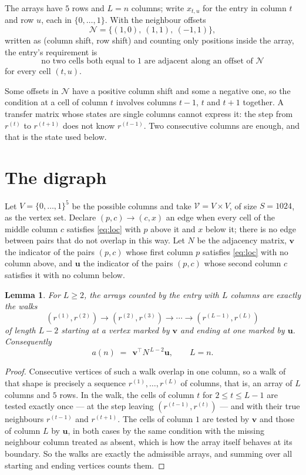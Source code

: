 \documentclass[11pt,a4paper]{article}
\theoremstyle{plain}
\newtheorem{lemma}[theorem]{Lemma}
\theoremstyle{definition}
\begin{document}
The arrays have $5$ rows and $L=n$ columns; write $x_{t,u}$ for the entry in
column $t$ and row $u$, each in $\{0,\dots,1\}$. With the neighbour offsets
\[
\mathcal N=\{(1,0),\ (1,1),\ (-1,1)\},
\]
written as (column shift, row shift) and counting only positions inside the array, the
entry's requirement is
\begin{equation}\label{eq:loc}
\text{no two cells both equal to }1\text{ are adjacent along an offset of }\mathcal N
\end{equation}
for every cell $(t,u)$.

Some offsets in $\mathcal N$ have a positive column shift and some a negative one, so the
condition at a cell of column $t$ involves columns $t-1$, $t$ and $t+1$ together. A transfer
matrix whose states are single columns cannot express it: the step from $r^{(t)}$ to
$r^{(t+1)}$ does not know $r^{(t-1)}$. Two consecutive columns are enough, and that is
the state used below.

\section{The digraph}

Let $V=\{0,\dots,1\}^{5}$ be the possible columns and take
$\mathcal V=V\times V$, of size $S=1024$, as the vertex set. Declare $(p,c)\to(c,x)$ an edge
when every cell of the middle column $c$ satisfies \eqref{eq:loc} with $p$ above it and $x$
below it; there is no edge between pairs that do not overlap in this way. Let $N$ be the
adjacency matrix, $\mathbf{v}$ the indicator of the pairs $(p,c)$ whose first column $p$
satisfies \eqref{eq:loc} with no column above, and $\mathbf{u}$ the indicator of
the pairs $(p,c)$ whose second column $c$ satisfies it with no column below.

\begin{lemma}\label{lem:walk}
For $L\ge2$, the arrays counted by the entry with $L$ columns are exactly the walks
\[
(r^{(1)},r^{(2)})\to(r^{(2)},r^{(3)})\to\cdots\to(r^{(L-1)},r^{(L)})
\]
of length $L-2$ starting at a vertex marked by $\mathbf{v}$ and ending at one marked by
$\mathbf{u}$. Consequently
\[
a(n)\;=\;\,\mathbf{v}^{\!\top}N^{\,L-2}\mathbf{u},\qquad L=n .
\]
\end{lemma}

\begin{proof}
Consecutive vertices of such a walk overlap in one column, so a walk of that shape is
precisely a sequence $r^{(1)},\dots,r^{(L)}$ of columns, that is, an array of $L$ columns
and $5$ rows. In the walk, the cells of column $t$ for $2\le t\le L-1$ are tested
exactly once --- at the step leaving $(r^{(t-1)},r^{(t)})$ --- and with their true
neighbours $r^{(t-1)}$ and $r^{(t+1)}$. The cells of column $1$ are tested by
$\mathbf{v}$ and those of column $L$ by $\mathbf{u}$, in both cases by the same condition
with the missing neighbour column treated as absent, which is how the array itself behaves at
its boundary. So the walks are exactly the admissible arrays, and summing over all starting
and ending vertices counts them.
\end{proof}
\end{document}
